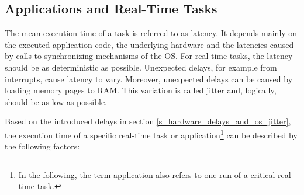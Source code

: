 \subsection{Applications and Real-Time Tasks}\label{ss_applications_and_realtime_tasks}
The mean execution time of a task is referred to as latency.
It depends mainly on the executed application code, the underlying hardware and the latencies caused by calls to synchronizing mechanisms of the \ac{OS}. 
For real-time tasks, the latency should be as deterministic as possible.
Unexpected delays, for example from interrupts, cause latency to vary.
Moreover, unexpected delays can be caused by loading memory pages to \ac{RAM}.
This variation is called jitter and, logically, should be as low as possible. 
\par
Based on the introduced delays in section \ref{s_hardware_delays_and_os_jitter}, the execution time of a specific real-time task or application\footnote{In the following, the term application also refers to one run of a critical real-time task.} can be described by the following factors:
